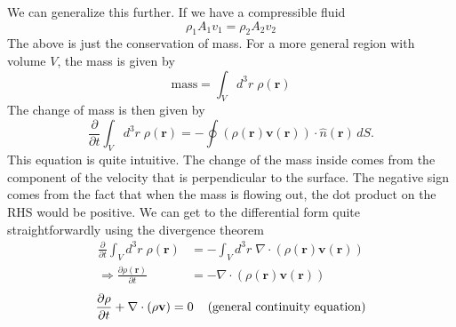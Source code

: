 \documentclass{report}
\numberwithin{equation}{section}
\newcommand{\pd}[2]{\frac{\partial #1}{\partial #2}}
\begin{document}
We can generalize this further. If we have a compressible fluid
\begin{equation*}
    \rho_1 A_1 v_1 = \rho_2 A_2 v_2
\end{equation*}
The above is just the conservation of mass. For a more general region with volume $V$, the mass is given by
\begin{equation}
        \text{mass} = \int_V d^3r\; \rho(\mathbf{r})
\end{equation}
The change of mass is then given by
\begin{equation}
        \pd{}{t}\int_V d^3r\; \rho(\mathbf{r}) = -\oint \left(\rho(\mathbf{r})\mathbf{v}(\mathbf{r})\right)\cdot \hat{n}(\mathbf{r})\,dS .
\end{equation}
This equation is quite intuitive. The change of the mass inside comes from the component of the
velocity that is perpendicular to the surface. The negative sign comes from the fact that when the mass is flowing
out, the dot product on the RHS would be positive. We can get to the differential form quite straightforwardly using the divergence theorem
\begin{align*}
    \pd{}{t}\int_V d^3r\; \rho(\mathbf{r}) &= -\int_V d^3 r\; \nabla\cdot \left(\rho(\mathbf{r})\mathbf{v}(\mathbf{r})\right)\\
     \Rightarrow \pd{\rho(\mathbf{r})}{t} &= -\nabla \cdot \left(\rho(\mathbf{r})\mathbf{v}(\mathbf{r})\right)
\end{align*}
\begin{equation}
    \pd{\rho}{t} + \nabla\cdot(\rho \mathbf{v})=0\hspace{0.4cm}\text{(general continuity equation)}
\end{equation}
\end{document}
